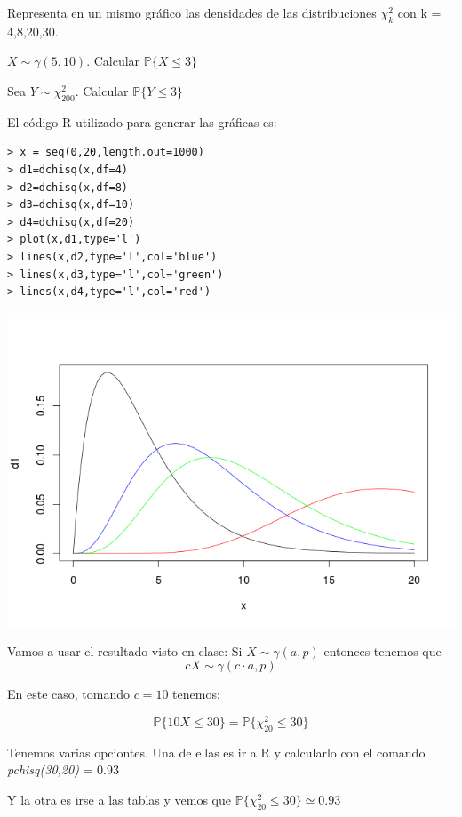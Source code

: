 \begin{problem}[3]

\ppart Representa en un mismo gráfico las densidades de las distribuciones $\chi^2_k $ con k = 4,8,20,30.

\ppart $X \sim \gamma(5,10)$. Calcular $\mathbb{P}\{X\leq 3\}$

\ppart Sea $Y \sim \chi_{200}^2$. Calcular $\mathbb{P}\{Y\leq 3\}$

\solution
\spart
El código R utilizado para generar las gráficas es:

\begin{verbatim}
> x = seq(0,20,length.out=1000)
> d1=dchisq(x,df=4)
> d2=dchisq(x,df=8)
> d3=dchisq(x,df=10)
> d4=dchisq(x,df=20)
> plot(x,d1,type='l')
> lines(x,d2,type='l',col='blue')
> lines(x,d3,type='l',col='green')
> lines(x,d4,type='l',col='red')
\end{verbatim}

\begin{center}
\includegraphics[width=1\textwidth]{img/Chicuadrado.png}
\label{Ejercicio 4}
\end{center}

\spart
Vamos a usar el resultado visto en clase:
Si $X\sim \gamma(a,p)$ entonces tenemos que 
\[cX \sim \gamma(c\cdot a, p)\]

En este caso, tomando $c=10$ tenemos:

\[\mathbb{P}\{10X\leq 30\} = \mathbb{P}\{\chi^2_{20 }\leq 30\}  \]

Tenemos varias opciontes. Una de ellas es ir a R y calcularlo con el comando \emph{pchisq(30,20)} = 0.93

Y la otra es irse a las tablas y vemos que $\mathbb{P}\{\chi^2_{20} \leq 30\} \simeq 0.93$


\end{problem}

